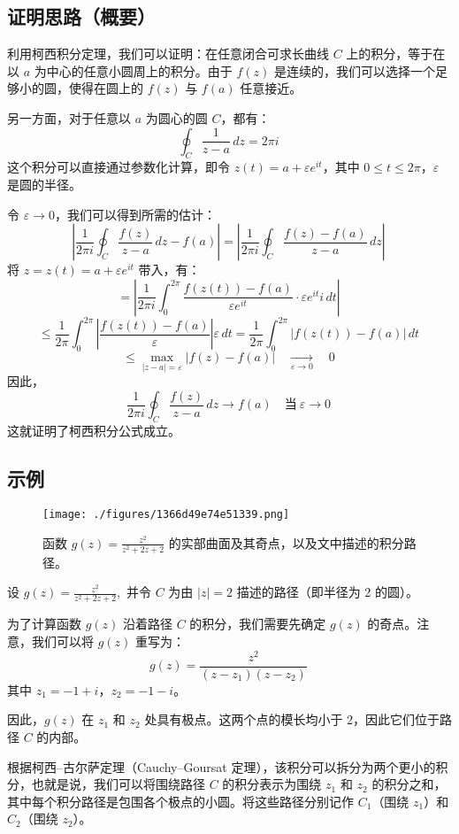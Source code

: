 \subsection{证明思路（概要）}
利用柯西积分定理，我们可以证明：在任意闭合可求长曲线 $C$ 上的积分，等于在以 $a$ 为中心的任意小圆周上的积分。由于 $f(z)$ 是连续的，我们可以选择一个足够小的圆，使得在圆上的 $f(z)$ 与 $f(a)$ 任意接近。

另一方面，对于任意以 $a$ 为圆心的圆 $C$，都有：
$$
\oint_{C} \frac{1}{z - a} \, dz = 2\pi i~
$$
这个积分可以直接通过参数化计算，即令 $z(t) = a + \varepsilon e^{it}$，其中 $0 \leq t \leq 2\pi$，$\varepsilon$ 是圆的半径。

令 $\varepsilon \to 0$，我们可以得到所需的估计：
$$
\left| \frac{1}{2\pi i} \oint_{C} \frac{f(z)}{z - a} \, dz - f(a) \right|
= \left| \frac{1}{2\pi i} \oint_{C} \frac{f(z) - f(a)}{z - a} \, dz \right|~
$$
将 $z = z(t) = a + \varepsilon e^{it}$ 带入，有：
$$
= \left| \frac{1}{2\pi i} \int_0^{2\pi} \frac{f(z(t)) - f(a)}{\varepsilon e^{it}} \cdot \varepsilon e^{it} i \, dt \right|~
$$
$$
\leq \frac{1}{2\pi} \int_0^{2\pi} \left| \frac{f(z(t)) - f(a)}{\varepsilon} \right| \varepsilon \, dt
= \frac{1}{2\pi} \int_0^{2\pi} |f(z(t)) - f(a)| \, dt~
$$
$$
\leq \max_{|z - a| = \varepsilon} |f(z) - f(a)| \quad \xrightarrow[\varepsilon \to 0]{} \quad 0~
$$
因此，
$$
\frac{1}{2\pi i} \oint_{C} \frac{f(z)}{z - a} \, dz \to f(a) \quad \text{当}~ \varepsilon \to 0~
$$
这就证明了柯西积分公式成立。
\subsection{示例}
\begin{figure}[ht]
\centering
\texttt{[image: ./figures/1366d49e74e51339.png]}
\caption{函数 $g(z) = \frac{z^2}{z^2 + 2z + 2}$ 的实部曲面及其奇点，以及文中描述的积分路径。} \label{fig_KXjfgs_1}
\end{figure}
设
$g(z) = \frac{z^2}{z^2 + 2z + 2},$
并令 $C$ 为由 $|z| = 2$ 描述的路径（即半径为 2 的圆）。

为了计算函数 $g(z)$ 沿着路径 $C$ 的积分，我们需要先确定 $g(z)$ 的奇点。注意，我们可以将 $g(z)$ 重写为：
$$
g(z) = \frac{z^2}{(z - z_1)(z - z_2)}~
$$
其中 $z_1 = -1 + i$，$z_2 = -1 - i$。

因此，$g(z)$ 在 $z_1$ 和 $z_2$ 处具有极点。这两个点的模长均小于 2，因此它们位于路径 $C$ 的内部。

根据柯西–古尔萨定理（Cauchy–Goursat 定理），该积分可以拆分为两个更小的积分，也就是说，我们可以将围绕路径 $C$ 的积分表示为围绕 $z_1$ 和 $z_2$ 的积分之和，其中每个积分路径是包围各个极点的小圆。将这些路径分别记作 $C_1$（围绕 $z_1$）和 $C_2$（围绕 $z_2$）。

